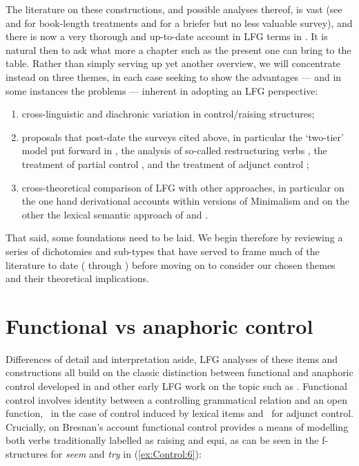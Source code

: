 \documentclass[output=paper,hidelinks]{langscibook}
\begin{document}
The literature on these constructions, and possible analyses thereof, is vast (see \citealt{DaviesDubinsky2004} and \citealt{Landau2013} for book-length treatments and \citealt{Polinsky2013} for a briefer but no less valuable survey), and there is now a very thorough and up-to-date account in LFG terms in \citet[chapter~15]{DLM:LFG}. It is natural then to ask what more a chapter such as the present one can bring to the table. Rather than simply serving up yet another overview, we will concentrate instead on three themes, in each case seeking to show the advantages --- and in some instances the problems --- inherent in adopting an LFG perspective:
\begin{enumerate}
\item cross-linguistic and diachronic variation in control/raising structures;
\item proposals that post-date the surveys cited above, in particular the `two-tier' model put forward in \citet{Landau2015}, the analysis of so-called restructuring verbs \citep{Grano2015}, the treatment of partial control \citep{Pearson2016,Sheehan2018b,Sheehan2018,SevdaliSheehan2021}, and the treatment of adjunct control \citep{Donaldson2021,Donaldson2021b,Landau2021};
\item cross-theoretical comparison of LFG with other approaches, in particular on the one hand derivational accounts within versions of Minimalism and on the other the lexical semantic approach of \citet{JackendoffCulicover2003} and \citet{CulicoverJackendoff2006}.
\end{enumerate}
That said, some foundations need to be laid. We begin therefore by reviewing a series of dichotomies and sub-types that have served to frame much of the literature to date ( through ) before moving on to consider our chosen themes and their theoretical implications.

\section{Functional vs anaphoric control}
\label{sec:Control:2}

Differences of detail and interpretation aside, LFG analyses of these items and constructions all build on the classic distinction between functional and anaphoric control developed in \citet{bresnan1982control-complementation} and other early LFG work on the topic such as \citet{mohanan83}. Functional control involves identity between a controlling grammatical relation and an open function, \XCOMP\ in the case of control induced by lexical items and \XADJ\ for adjunct control. Crucially, on Bresnan's account functional control provides a means of modelling both verbs traditionally labelled as raising and equi, as can be seen in the f-structures for \emph{seem} and \emph{try} in (\ref{ex:Control:6}):
\end{document}
